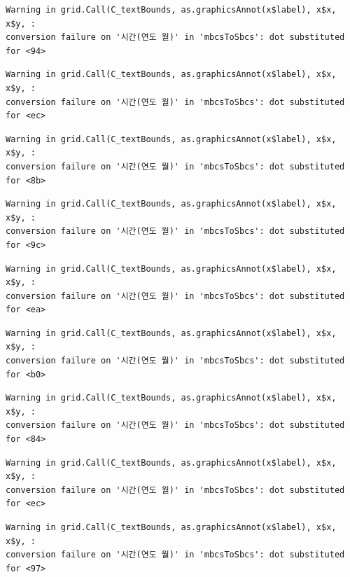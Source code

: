 \documentclass[
  letterpaper,
  DIV=11,
  numbers=noendperiod]{scrreprt}
\begin{document}
\begin{verbatim}
Warning in grid.Call(C_textBounds, as.graphicsAnnot(x$label), x$x, x$y, :
conversion failure on '시간(연도 월)' in 'mbcsToSbcs': dot substituted for <94>
\end{verbatim}

\begin{verbatim}
Warning in grid.Call(C_textBounds, as.graphicsAnnot(x$label), x$x, x$y, :
conversion failure on '시간(연도 월)' in 'mbcsToSbcs': dot substituted for <ec>
\end{verbatim}

\begin{verbatim}
Warning in grid.Call(C_textBounds, as.graphicsAnnot(x$label), x$x, x$y, :
conversion failure on '시간(연도 월)' in 'mbcsToSbcs': dot substituted for <8b>
\end{verbatim}

\begin{verbatim}
Warning in grid.Call(C_textBounds, as.graphicsAnnot(x$label), x$x, x$y, :
conversion failure on '시간(연도 월)' in 'mbcsToSbcs': dot substituted for <9c>
\end{verbatim}

\begin{verbatim}
Warning in grid.Call(C_textBounds, as.graphicsAnnot(x$label), x$x, x$y, :
conversion failure on '시간(연도 월)' in 'mbcsToSbcs': dot substituted for <ea>
\end{verbatim}

\begin{verbatim}
Warning in grid.Call(C_textBounds, as.graphicsAnnot(x$label), x$x, x$y, :
conversion failure on '시간(연도 월)' in 'mbcsToSbcs': dot substituted for <b0>
\end{verbatim}

\begin{verbatim}
Warning in grid.Call(C_textBounds, as.graphicsAnnot(x$label), x$x, x$y, :
conversion failure on '시간(연도 월)' in 'mbcsToSbcs': dot substituted for <84>
\end{verbatim}

\begin{verbatim}
Warning in grid.Call(C_textBounds, as.graphicsAnnot(x$label), x$x, x$y, :
conversion failure on '시간(연도 월)' in 'mbcsToSbcs': dot substituted for <ec>
\end{verbatim}

\begin{verbatim}
Warning in grid.Call(C_textBounds, as.graphicsAnnot(x$label), x$x, x$y, :
conversion failure on '시간(연도 월)' in 'mbcsToSbcs': dot substituted for <97>
\end{verbatim}
\end{document}
